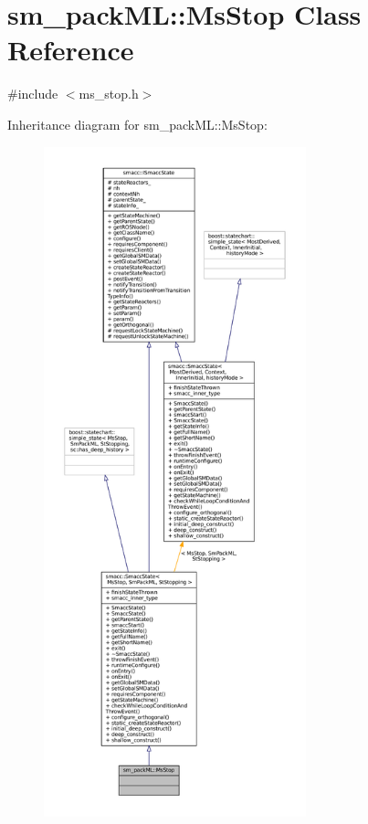 \hypertarget{classsm__packML_1_1MsStop}{}\section{sm\+\_\+pack\+ML\+:\+:Ms\+Stop Class Reference}
\label{classsm__packML_1_1MsStop}


{\ttfamily \#include $<$ms\+\_\+stop.\+h$>$}



Inheritance diagram for sm\+\_\+pack\+ML\+:\+:Ms\+Stop\+:
\nopagebreak
\begin{figure}[H]
\begin{center}
\leavevmode
\includegraphics[height=550pt]{classsm__packML_1_1MsStop__inherit__graph}
\end{center}
\end{figure}


